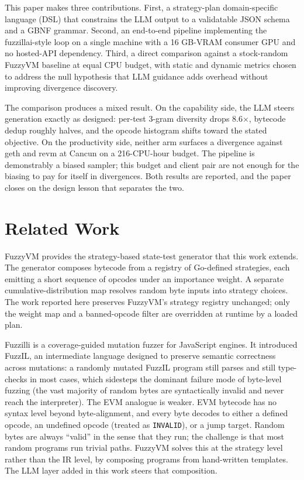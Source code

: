 \documentclass[conference]{IEEEtran}
\begin{document}
This paper makes three contributions. First, a strategy-plan domain-specific language (DSL) that constrains the LLM output to a validatable JSON schema and a GBNF grammar. Second, an end-to-end pipeline implementing the fuzzillai-style loop \cite{fuzzillai} on a single machine with a 16 GB-VRAM consumer GPU and no hosted-API dependency. Third, a direct comparison against a stock-random FuzzyVM baseline at equal CPU budget, with static and dynamic metrics chosen to address the null hypothesis that LLM guidance adds overhead without improving divergence discovery.

The comparison produces a mixed result. On the capability side, the LLM steers generation exactly as designed: per-test 3-gram diversity drops 8.6$\times$, bytecode dedup roughly halves, and the opcode histogram shifts toward the stated objective. On the productivity side, neither arm surfaces a divergence against geth and revm at Cancun on a 216-CPU-hour budget. The pipeline is demonstrably a biased sampler; this budget and client pair are not enough for the biasing to pay for itself in divergences. Both results are reported, and the paper closes on the design lesson that separates the two.

\section{Related Work}

FuzzyVM \cite{fuzzyvm} provides the strategy-based state-test generator that this work extends. The generator composes bytecode from a registry of Go-defined strategies, each emitting a short sequence of opcodes under an importance weight. A separate cumulative-distribution map resolves random byte inputs into strategy choices. The work reported here preserves FuzzyVM's strategy registry unchanged; only the weight map and a banned-opcode filter are overridden at runtime by a loaded plan.

Fuzzilli \cite{fuzzilli} is a coverage-guided mutation fuzzer for JavaScript engines. It introduced FuzzIL, an intermediate language designed to preserve semantic correctness across mutations: a randomly mutated FuzzIL program still parses and still type-checks in most cases, which sidesteps the dominant failure mode of byte-level fuzzing (the vast majority of random bytes are syntactically invalid and never reach the interpreter). The EVM analogue is weaker. EVM bytecode has no syntax level beyond byte-alignment, and every byte decodes to either a defined opcode, an undefined opcode (treated as \texttt{INVALID}), or a jump target. Random bytes are always ``valid'' in the sense that they run; the challenge is that most random programs run trivial paths. FuzzyVM solves this at the strategy level rather than the IR level, by composing programs from hand-written templates. The LLM layer added in this work steers that composition.
\end{document}
